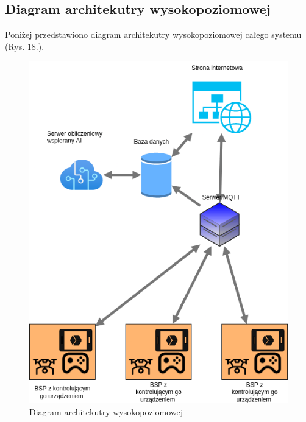 \newpage
\subsection{Diagram architekutry wysokopoziomowej}

Poniżej przedstawiono diagram architekutry wysokopoziomowej całego systemu (Rys. 18.). 



\begin{figure}[!ht]
  \centering
  \includegraphics[width=13cm]{./Obrazy/highlevel.png}
  \caption{Diagram architekutry wysokopoziomowej}
  \end{figure}

\newpage
